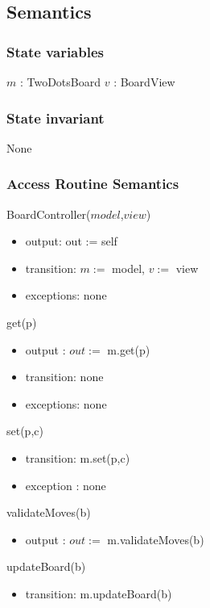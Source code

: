 \documentclass[12pt]{article}
\begin{document}
\subsection* {Semantics}


\subsubsection* {State variables}
\noindent $m$ : TwoDotsBoard
\noindent $v$ : BoardView



\subsubsection*{State invariant}
\noindent None

\subsubsection* {Access Routine Semantics}


\noindent BoardController($model$,$view$)
\begin{itemize} 
\item output: out := self
\item transition: $m:=$ model, $v:=$ view
\item exceptions: none
\end{itemize}

\noindent get(p)
\begin{itemize}
\item output : $out := $ m.get(p)
\item transition: none
\item exceptions: none
\end{itemize}

\noindent set(p,c)
\begin{itemize}
\item transition: m.set(p,c)
\item exception : none
\end{itemize}

\noindent validateMoves(b)
\begin{itemize}
\item output : $out := $ m.validateMoves(b)
\end{itemize}

\noindent updateBoard(b)
\begin{itemize}
\item transition: m.updateBoard(b)
\end{itemize}
\end{document}
